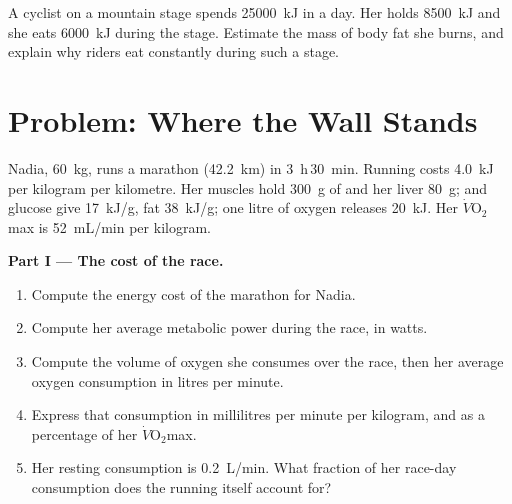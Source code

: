 \begin{exercise}[$\star\star\star$]\label{exo:g10:exercise-and-energy:15}
A cyclist on a mountain stage spends \qty{25000}{kJ} in a day. Her
 holds \qty{8500}{kJ} and she eats \qty{6000}{kJ} during the
stage. Estimate the mass of body fat she burns, and explain why riders
eat constantly during such a stage.
\end{exercise}

\section{Problem: Where the Wall Stands}

\begin{problem}
\label{pb:g10:exercise-and-energy:1}
Nadia, \qty{60}{kg}, runs a marathon (\qty{42.2}{km}) in
\qty{3}{h}\,\qty{30}{min}. Running costs \qty{4.0}{kJ} per kilogram
per kilometre. Her muscles hold \qty{300}{g} of  and her liver
\qty{80}{g};  and glucose give \qty{17}{kJ/g}, fat
\qty{38}{kJ/g}; one litre of oxygen releases \qty{20}{kJ}. Her
$\dot V\!\mathrm{O_2}$max is \qty{52}{mL/min} per kilogram.

\medskip
\noindent\textbf{Part I --- The cost of the race.}
\begin{enumerate}
  \item Compute the energy cost of the marathon for Nadia.
  \item Compute her average metabolic power during the race, in
        watts.
  \item Compute the volume of oxygen she consumes over the race, then
        her average oxygen consumption in litres per minute.
  \item Express that consumption in millilitres per minute per
        kilogram, and as a percentage of her
        $\dot V\!\mathrm{O_2}$max.
  \item Her resting consumption is \qty{0.2}{L/min}. What fraction of
        her race-day consumption does the running itself account for?
\end{enumerate}


\end{problem}
